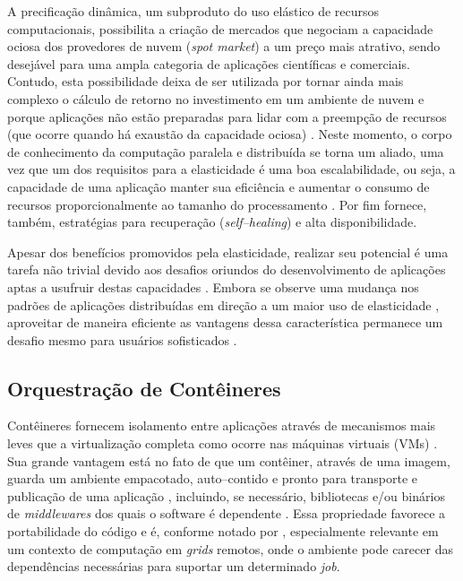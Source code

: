 \documentclass[english,brazilian]{UNISINOSmonografia} %
\begin{document}
A precificação dinâmica, um subproduto do uso elástico de recursos computacionais, possibilita a criação de mercados que negociam a capacidade ociosa dos provedores de nuvem (\textit{spot market}) a um preço mais atrativo, sendo desejável para uma ampla categoria de aplicações científicas e comerciais.
Contudo, esta possibilidade deixa de ser utilizada por tornar ainda mais complexo o cálculo de retorno no investimento em um ambiente de nuvem e porque aplicações não estão preparadas para lidar com a preempção de recursos (que ocorre quando há exaustão da capacidade ociosa) \cite{Jonas2017}.
Neste momento, o corpo de conhecimento da computação paralela e distribuída se torna um aliado, uma vez que um dos requisitos para a elasticidade é uma boa escalabilidade, ou seja, a capacidade de uma aplicação manter sua eficiência e aumentar o consumo de recursos proporcionalmente ao tamanho do processamento \cite{Galante2012,HennessyPatterson2013}.
Por fim fornece, também, estratégias para recuperação (\textit{self--healing}) e alta disponibilidade.


Apesar dos benefícios promovidos pela elasticidade, realizar seu potencial é uma tarefa não trivial devido aos desafios oriundos do desenvolvimento de aplicações aptas a usufruir destas capacidades \cite{Raveendran2011,Loff2014}.
Embora se observe uma mudança nos padrões de aplicações distribuídas em direção a um maior uso de elasticidade \cite{Shankar2018}, aproveitar de maneira eficiente as vantagens dessa característica permanece um desafio mesmo para usuários sofisticados \cite{Jonas2017}.


\subsection{Orquestração de Contêineres}


Contêineres fornecem isolamento entre aplicações através de mecanismos mais leves que a virtualização completa como ocorre nas máquinas virtuais (VMs) \cite{Awada2017}.
Sua grande vantagem está no fato de que um contêiner, através de uma imagem, guarda um ambiente empacotado, auto--contido e pronto para transporte e publicação de uma aplicação \cite{Pahl2015a}, incluindo, se necessário, bibliotecas e/ou binários de \textit{middlewares} dos quais o software é dependente \cite{Awada2017}.
Essa propriedade favorece a portabilidade do código e é, conforme notado por , especialmente relevante em um contexto de computação em \textit{grids} remotos, onde o ambiente pode carecer das dependências necessárias para suportar um determinado \textit{job}.
\end{document}
